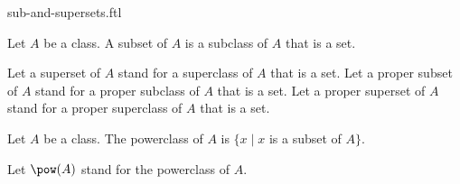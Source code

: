 \documentclass{naproche-library}
\begin{document}
\begin{smodule}[title=Sub- and Supersets]{sub-and-supersets.ftl}

\begin{definition}[forthel,id=FOUNDATIONS_10_1346889551183872]
  Let $A$ be a class.
  A subset of $A$ is a subclass of $A$ that is a set.

  Let a superset of $A$ stand for a superclass of $A$ that is a set.
  Let a proper subset of $A$ stand for a proper subclass of $A$ that is a set.
  Let a proper superset of $A$ stand for a proper superclass of $A$ that is a set.
\end{definition}

\begin{definition}[forthel,id=FOUNDATIONS_10_1448589907722240]
  Let $A$ be a class.
  The powerclass of $A$ is $\{ x \mid x$ is a subset of $A \}$.

  Let $\pow(A)$ stand for the powerclass of $A$.
\end{definition}
\end{smodule}
\end{document}
